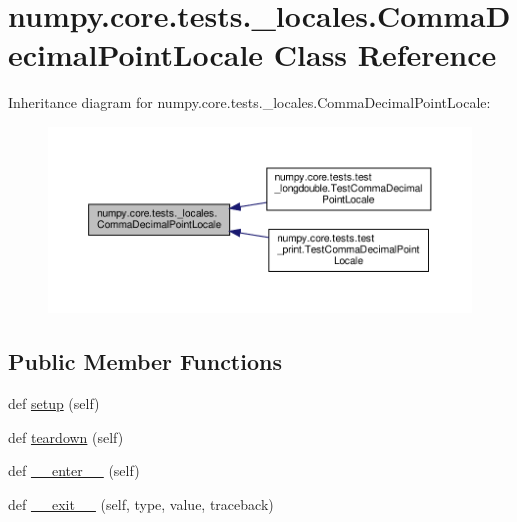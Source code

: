 \hypertarget{classnumpy_1_1core_1_1tests_1_1__locales_1_1CommaDecimalPointLocale}{}\section{numpy.\+core.\+tests.\+\_\+locales.\+Comma\+Decimal\+Point\+Locale Class Reference}
\label{classnumpy_1_1core_1_1tests_1_1__locales_1_1CommaDecimalPointLocale}


Inheritance diagram for numpy.\+core.\+tests.\+\_\+locales.\+Comma\+Decimal\+Point\+Locale\+:
\nopagebreak
\begin{figure}[H]
\begin{center}
\leavevmode
\includegraphics[width=350pt]{classnumpy_1_1core_1_1tests_1_1__locales_1_1CommaDecimalPointLocale__inherit__graph}
\end{center}
\end{figure}
\subsection*{Public Member Functions}
\begin{DoxyCompactItemize}
\item 
def \hyperlink{classnumpy_1_1core_1_1tests_1_1__locales_1_1CommaDecimalPointLocale_a807b16c2ee0d1cc3ae405800643a26dd}{setup} (self)
\item 
def \hyperlink{classnumpy_1_1core_1_1tests_1_1__locales_1_1CommaDecimalPointLocale_adbfa87b9a18e241865f8471a91d38792}{teardown} (self)
\item 
def \hyperlink{classnumpy_1_1core_1_1tests_1_1__locales_1_1CommaDecimalPointLocale_a2db23aa216e0697e611703d2ee6c5888}{\+\_\+\+\_\+enter\+\_\+\+\_\+} (self)
\item 
def \hyperlink{classnumpy_1_1core_1_1tests_1_1__locales_1_1CommaDecimalPointLocale_aa6cb5e7aedcebb9e4981f881e6fbf349}{\+\_\+\+\_\+exit\+\_\+\+\_\+} (self, type, value, traceback)
\end{DoxyCompactItemize}

